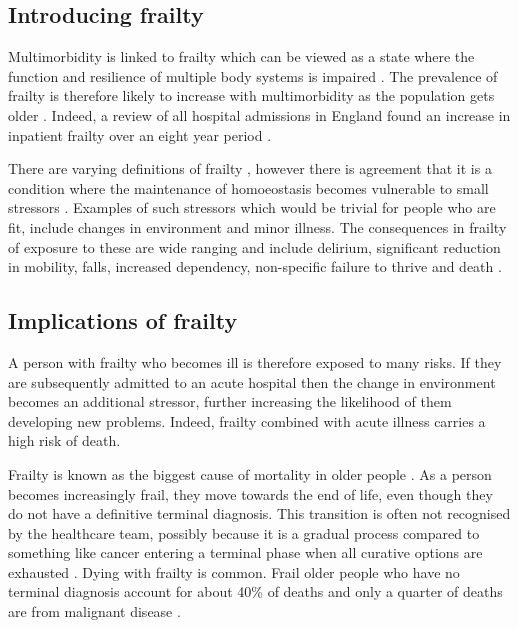 \documentclass
[
	12pt,
	a4paper,
	oneside,
]{report}
\begin{document}
\subsection{Introducing frailty}

Multimorbidity is linked to frailty which can be viewed as a state where 
the function and resilience of multiple body systems is impaired \parencite{woo:14}. 
The prevalence of frailty is therefore likely to increase with multimorbidity 
as the population
gets older \parencite{sharp:13}. Indeed, a review of all hospital admissions in 
England found an increase in inpatient frailty over an eight year period 
\parencite{soong:15}.

There are varying definitions of frailty \parencite{soong:15}, however there is 
agreement that it is a condition where the maintenance of homoeostasis 
becomes vulnerable to small stressors \parencite{vellas:16}. Examples of such 
stressors which would be trivial for people who are fit, include changes in 
environment and minor illness. The consequences in frailty of 
exposure to these are wide ranging and include delirium, significant reduction 
in mobility, falls, increased dependency, non-specific failure to thrive and death 
\parencite{bgs:14,oliver:14,vellas:16}.

\subsection{Implications of frailty}

A person with frailty who becomes ill is therefore exposed to many risks. If
they are subsequently admitted to an acute hospital then the  
change in environment becomes an additional stressor, further increasing the 
likelihood of them developing
new problems. Indeed, frailty combined with acute illness carries a high risk 
of death.

Frailty is known as the biggest cause of mortality in older people 
\parencite{gill:10}. As a person becomes increasingly frail, they move towards 
the end of life, even 
though they do not have a definitive terminal diagnosis. This transition is
often not recognised by the healthcare team, possibly because it is a gradual process
compared to something like cancer entering a terminal phase when all curative
options are exhausted \parencite{oliver:14}. Dying with frailty is common.
Frail older people who have no terminal diagnosis account for about 40\% of 
deaths and only a quarter of deaths are from malignant disease \parencite{sharp:13}.
\end{document}
